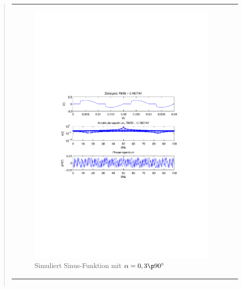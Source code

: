 \begin{quote}
\begin{center}
\begin{tabular}{ll}
            \begin{minipage}{0.6\textwidth}
                \begin{figure}[H]
                    \label{fig:pico_sin_f-50_a-00}
                    \includegraphics[scale=0.55, trim = 35mm 100mm 35mm 95mm, clip]{Bilder/sin_f-50_a-0,3}
                    \caption{Simuliert Sinus-Funktion mit $\alpha = 0,3 \p 90^\circ$}
                \end{figure}
        
            \end{minipage}
        
        \end{tabular}
        \end{center}





        \begin{center}
        \begin{tabular}{ll}
        

\end{tabular}
\end{center}
\end{quote}
